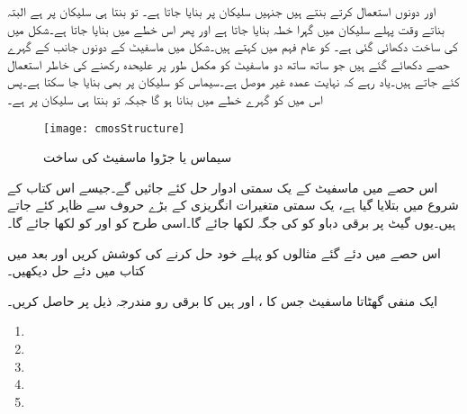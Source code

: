    اور   دونوں استعمال کرتے بنتے ہیں جنہیں   سلیکان پر بنایا جاتا ہے۔ تو بنتا ہی  سلیکان پر ہے البتہ  بناتے وقت پہلے  سلیکان میں گہرا  خطہ بنایا جاتا ہے اور پھر اس خطے میں  بنایا جاتا ہے۔شکل  میں  کی ساخت دکھائی گئی ہے۔ کو عام فہم میں  کہتے ہیں۔شکل میں ماسفیٹ کے دونوں جانب  کے گہرے حصے دکھائے گئے ہیں جو ساتھ ساتھ دو ماسفیٹ کو مکمل طور پر علیحدہ رکھنے کی خاطر استعمال کئے جاتے ہیں۔یاد رہے کہ  نہایت عمدہ غیر موصل ہے۔سیماس کو  سلیکان پر بھی بنایا جا سکتا ہے۔پس اس میں  کو گہرے  خطے میں بنانا ہو گا جبکہ  تو بنتا ہی  سلیکان پر ہے۔ 
\begin{figure}
\centering
\texttt{[image: cmosStructure]}
\caption{سیماس یا جڑوا ماسفیٹ کی ساخت}
\label{شکل_ماسفیٹ_سیماس_کی_ساخت}
\end{figure}

اس حصے میں ماسفیٹ کے یک سمتی ادوار حل کئے جائیں گے۔جیسے اس کتاب کے شروع میں بتلایا گیا ہے، یک سمتی متغیرات انگریزی کے بڑے حروف سے ظاہر کئے جاتے ہیں۔یوں گیٹ پر برقی دباو کو  کی جگہ  لکھا جائے گا۔اسی طرح  کو  اور  کو  لکھا جائے گا۔

اس حصے میں دئے گئے مثالوں کو پہلے خود حل کرنے کی کوشش کریں اور بعد میں کتاب میں دئے حل دیکھیں۔

ایک منفی  گھٹاتا ماسفیٹ جس کا ،  اور
  ہیں کا برقی رو مندرجہ ذیل پر حاصل کریں۔
\begin{enumerate}
\item
{}
\item
{}
\item
{}
\item
{}
\item
{}

\end{enumerate}



